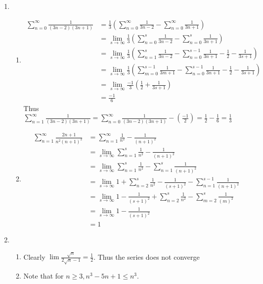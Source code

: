 \documentclass[12pt, letterpaper]{article}
\begin{document}
\begin{enumerate}
	\item 
	\begin{enumerate}
		\item 
		\begin{align*}
			\sum_{n=0}^\infty \frac{1}{(3n-2)(3n+1)} &= \frac{1}{3}\left(\sum_{n=0}^\infty \frac{1}{3n-2} -\sum_{n=0}^\infty \frac{1}{3n+1}\right)\\
			&= \lim_{s \to \infty }\frac{1}{3}\left(\sum_{n=0}^s \frac{1}{3n-2} -\sum_{n=0}^s \frac{1}{3n+1}  \right)\\
			&= \lim_{s \to \infty } \frac{1}{3}\left(\sum_{n=1}^s \frac{1}{3n-2} -\sum_{n=0}^{s-1} \frac{1}{3n+1} -\frac{1}{2} - \frac{1}{3s+1} \right)\\
			&= \lim_{s \to \infty } \frac{1}{3}\left(\sum_{m=0}^{s-1} \frac{1}{3m+1} -\sum_{n=0}^{s-1} \frac{1}{3n+1} -\frac{1}{2} - \frac{1}{3s+1} \right)\\
			&= \lim_{s \to \infty } \frac{-1}{3}\left( \frac{1}{2} + \frac{1}{3s+1}\right)\\
			&= \frac{-1}{6}
		\end{align*}
		Thus $\sum_{n=1}^\infty \frac{1}{(3n-2)(3n+1)} = \sum_{n=0}^\infty \frac{1}{(3n-2)(3n+1)} - \left( \frac{-1}{2} \right) = \frac{1}{2} - \frac{1}{6}
		= \frac{1}{3}$
		\item 
		\begin{align*}
			\sum_{n=1}^\infty \frac{2n+1}{n^2(n+1)^2} &= 
			\sum_{n=1}^\infty \frac{1}{n^2} - \frac{1}{(n+1)^2}\\
			&= \lim_{s \to \infty} \sum_{n=1}^s\frac{1}{n^2} - \frac{1}{(n+1)^2}\\
			&= \lim_{s \to \infty} \sum_{n=1}^s\frac{1}{n^2} -\sum_{n=1}^s\frac{1}{(n+1)^2}\\
			&= \lim_{s \to \infty} 1 + \sum_{n=2}^s\frac{1}{n^2} - \frac{1}{(s+1)^2}- \sum_{n=1}^{s-1}\frac{1}{(n+1)^2}\\
			&=\lim_{s \to \infty} 1 - \frac{1}{(s+1)^2} + \sum_{n=2}^s\frac{1}{n^2}- \sum_{m=2}^{s}\frac{1}{(m)^2}\\
			&= \lim_{s \to \infty} 1 - \frac{1}{(s+1)^2}\\
			&= 1
 		\end{align*}
	\end{enumerate}
	\item 
	\begin{enumerate}
		\item Clearly $\lim \frac{\sqrt{n}}{2\sqrt{n} - 1} = \frac{1}{2}$.  
		Thus the series does not converge
		\item Note that for $n \geq 3, n^3 - 5n + 1 \leq n^3$.  

\end{enumerate}
\end{enumerate}
\end{document}
